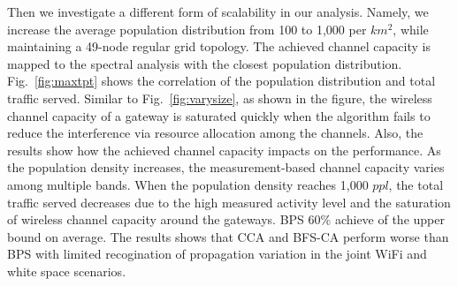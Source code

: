 Then we investigate a different form of scalability in our analysis.  Namely,
we increase the average population distribution from 100 to 1,000 per $km^2$, while
maintaining a 49-node regular grid topology. The achieved channel capacity is mapped 
to the spectral analysis with the closest population distribution. 
%
%
Fig.~\ref{fig:maxtpt} shows the correlation of the population distribution and total traffic served. 
Similar to Fig.~\ref{fig:varysize}, as shown in the figure, the wireless channel capacity of a 
gateway is saturated quickly when the algorithm fails to 
reduce the interference via resource allocation among the channels.
Also, the results show how the achieved channel capacity impacts on the performance. 
As the population density increases, the measurement-based channel capacity varies among multiple 
bands. When the population density reaches 1,000 $ppl$, the total traffic served decreases
due to the high measured activity level and the saturation of wireless channel capacity 
around the gateways. BPS 60\% achieve of the upper bound on average. 
The results shows that CCA and BFS-CA perform worse than BPS with limited recogination of 
propagation variation in the joint WiFi and white space scenarios.

